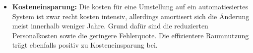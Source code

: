 \begin{itemize}
	\item \textbf{Kosteneinsparung:}
	Die kosten für eine Umstellung auf ein automatiesiertes System ist zwar recht kosten intensiv, allerdings amortisert sich die Änderung meist innerhalb weniger Jahre. Grund dafür sind die reduzierten Personalkosten sowie die geringere Fehlerquote. Die effizientere Raumnutzung trägt ebenfalls positiv zu Kosteneinsparung bei. \autocite{mueller2023}
	
\end{itemize}